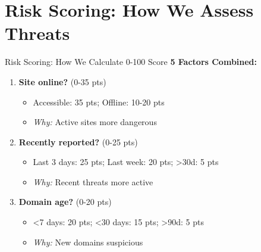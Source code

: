 \documentclass[aspectratio=169]{beamer}
\begin{document}
\section{Risk Scoring: How We Assess Threats}

\begin{frame}{Risk Scoring: How We Calculate 0-100 Score}
\small
\textbf{5 Factors Combined:}

\vspace{0.2cm}
\begin{enumerate}
    \item \textbf{\textcolor{criticalred}{Site online?}} (0-35 pts)
    \begin{itemize}
        \scriptsize
        \item Accessible: 35 pts; Offline: 10-20 pts
        \item \textit{Why:} Active sites more dangerous
    \end{itemize}
    
    \item \textbf{\textcolor{highorange}{Recently reported?}} (0-25 pts)
    \begin{itemize}
        \scriptsize
        \item Last 3 days: 25 pts; Last week: 20 pts; >30d: 5 pts
        \item \textit{Why:} Recent threats more active
    \end{itemize}
    
    \item \textbf{\textcolor{mediumyellow}{Domain age?}} (0-20 pts)
    \begin{itemize}
        \scriptsize
        \item <7 days: 20 pts; <30 days: 15 pts; >90d: 5 pts
        \item \textit{Why:} New domains suspicious
    \end{itemize}
\end{enumerate}
\end{frame}
\end{document}
